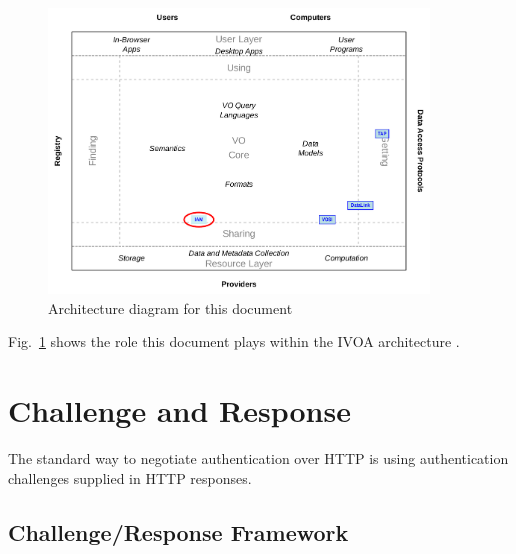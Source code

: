 \documentclass[11pt,a4paper]{ivoa}
\begin{document}
\begin{figure}
\centering


\includegraphics[width=0.9\textwidth]{role_diagram.pdf}
\caption{Architecture diagram for this document}
\label{fig:archdiag}
\end{figure}

Fig.~\ref{fig:archdiag} shows the role this document plays within the
IVOA architecture \citep{2021ivoa.spec.1101D}.



\section{Challenge and Response}

The standard way to negotiate authentication over HTTP is using 
authentication challenges supplied in HTTP responses.

\subsection{Challenge/Response Framework}
\end{document}
